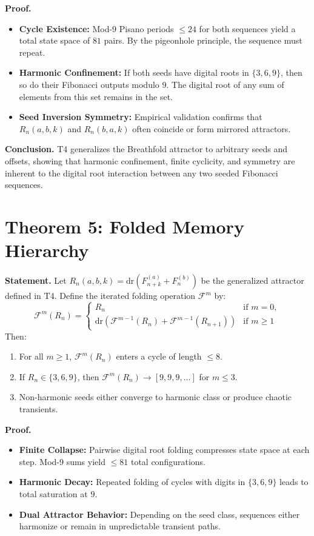 \documentclass[12pt]{article}
\begin{document}
\textbf{Proof.}
\begin{itemize}
  \item \textbf{Cycle Existence:} Mod-9 Pisano periods \( \leq 24 \) for both sequences yield a total state space of \( 81 \) pairs. By the pigeonhole principle, the sequence must repeat.
  \item \textbf{Harmonic Confinement:} If both seeds have digital roots in \( \{3, 6, 9\} \), then so do their Fibonacci outputs modulo 9. The digital root of any sum of elements from this set remains in the set.
  \item \textbf{Seed Inversion Symmetry:} Empirical validation confirms that \( R_n(a, b, k) \) and \( R_n(b, a, k) \) often coincide or form mirrored attractors.
\end{itemize}

\textbf{Conclusion.} T4 generalizes the Breathfold attractor to arbitrary seeds and offsets, showing that harmonic confinement, finite cyclicity, and symmetry are inherent to the digital root interaction between any two seeded Fibonacci sequences.

\section*{Theorem 5: Folded Memory Hierarchy}
\textbf{Statement.} Let \( R_n(a, b, k) = \mathrm{dr}(F^{(a)}_{n+k} + F^{(b)}_n) \) be the generalized attractor defined in T4. Define the iterated folding operation \( \mathcal{F}^m \) by:
\[
\mathcal{F}^m(R_n) =
\begin{cases}
  R_n & \text{if } m = 0, \\
  \mathrm{dr}(\mathcal{F}^{m-1}(R_n) + \mathcal{F}^{m-1}(R_{n+1})) & \text{if } m \geq 1
\end{cases}
\]
Then:
\begin{enumerate}
  \item For all \( m \geq 1 \), \( \mathcal{F}^m(R_n) \) enters a cycle of length \( \leq 8 \).
  \item If \( R_n \in \{3, 6, 9\} \), then \( \mathcal{F}^m(R_n) \to [9, 9, 9, \dots] \) for \( m \leq 3 \).
  \item Non-harmonic seeds either converge to harmonic class or produce chaotic transients.
\end{enumerate}

\textbf{Proof.}
\begin{itemize}
  \item \textbf{Finite Collapse:} Pairwise digital root folding compresses state space at each step. Mod-9 sums yield \( \leq 81 \) total configurations.
  \item \textbf{Harmonic Decay:} Repeated folding of cycles with digits in \( \{3, 6, 9\} \) leads to total saturation at \( 9 \).
  \item \textbf{Dual Attractor Behavior:} Depending on the seed class, sequences either harmonize or remain in unpredictable transient paths.
\end{itemize}
\end{document}
